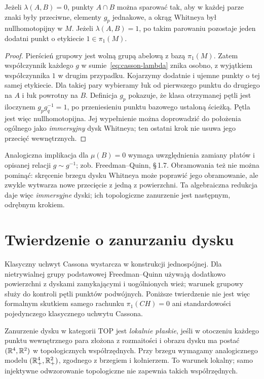 \begin{stwierdzenie}
\label{prop:casson-pairing}
Jeżeli $\lambda(A,B)=0$, punkty $A\cap B$ można
sparować tak, aby w każdej parze znaki były
przeciwne, elementy $g_p$ jednakowe, a okrąg
Whitneya był nullhomotopijny w $M$. Jeżeli
$\lambda(A,B)=1$, po takim parowaniu pozostaje
jeden dodatni punkt o etykiecie $1\in\pi_1(M)$.
\end{stwierdzenie}
\begin{proof}
Pierścień grupowy jest wolną grupą abelową z bazą
$\pi_1(M)$. Zatem współczynnik każdego $g$
w sumie~\eqref{eq:casson-lambda} znika osobno,
z wyjątkiem współczynnika $1$ w drugim przypadku.
Kojarzymy dodatnie i ujemne punkty o tej samej
etykiecie. Dla takiej pary wybieramy łuk od
pierwszego punktu do drugiego na $A$ i łuk
powrotny na $B$. Definicja $g_p$ pokazuje,
że klasa otrzymanej pętli jest iloczynem
$g_p g_q^{-1}=1$, po przeniesieniu punktu bazowego
ustaloną ścieżką. Pętla jest więc nullhomotopijna.
Jej wypełnienie można doprowadzić do położenia
ogólnego jako \emph{immersyjny} dysk Whitneya;
ten ostatni krok nie usuwa jego przecięć wewnętrznych.
\end{proof}

Analogiczna implikacja dla $\mu(B)=0$ wymaga
uwzględnienia zamiany płatów i opisanej relacji
$g\sim g^{-1}$; zob.
Freedman--Quinn, \S\,1.7. Obramowania też
nie można pominąć: skręcenie brzegu dysku
Whitneya może poprawić jego obramowanie,
ale zwykle wytwarza nowe przecięcie z jedną
z powierzchni. Ta algebraiczna redukcja daje
więc \emph{immersyjne} dyski; ich topologiczne
zanurzenie jest następnym, odrębnym krokiem.

\section{Twierdzenie o zanurzaniu dysku}
\label{sec:casson-disk-theorem}

Klasyczny uchwyt Cassona wystarcza w konstrukcji
jednospójnej. Dla nietrywialnej grupy podstawowej
Freedman--Quinn używają dodatkowo powierzchni z
dyskami zamykającymi i uogólnionych wież; warunek
grupowy służy do kontroli pętli punktów podwójnych.
Poniższe twierdzenie nie jest więc formalnym skutkiem
samego rachunku $\pi_1(CH)=0$ ani standardowości
pojedynczego klasycznego uchwytu Cassona.

Zanurzenie dysku w kategorii TOP jest \emph{lokalnie płaskie},
jeśli w otoczeniu każdego punktu wewnętrznego para
złożona z rozmaitości i obrazu dysku ma postać
$(\mathbb{R}^4,\mathbb{R}^2)$ w topologicznych współrzędnych.
Przy brzegu wymagamy analogicznego modelu
$(\mathbb{R}^4_+,\mathbb{R}^2_+)$, zgodnego z brzegiem i kołnierzem.
To warunek lokalny; samo injektywne odwzorowanie
topologiczne nie zapewnia takich współrzędnych.

